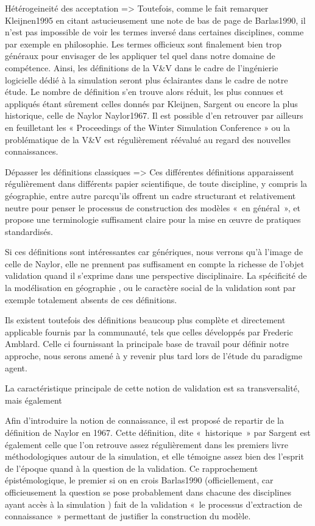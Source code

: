 Hétérogeineité des acceptation => Toutefois, comme le fait remarquer {Kleijnen1995} en citant astucieusement une note de bas de page de {Barlas1990}, il n'est pas impossible de voir les termes inversé dans certaines disciplines, comme par exemple en philosophie. Les termes officieux sont finalement bien trop généraux pour envisager de les appliquer tel quel dans notre domaine de compétence. Ainsi, les définitions de la V\&V dans le cadre de l'ingénierie logicielle dédié à la simulation seront plus éclairantes dans le cadre de notre étude. Le nombre de définition s'en trouve alors réduit, les plus connues et appliqués étant sûrement celles donnés par Kleijnen, Sargent ou encore la plus historique, celle de Naylor {Naylor1967}. Il est possible d'en retrouver par ailleurs en feuilletant les « Proceedings of the Winter Simulation Conference » ou la problématique de la V&V est régulièrement réévalué au regard des nouvelles connaissances. 



Dépasser les définitions classiques => Ces différentes définitions apparaissent régulièrement dans différents papier scientifique, de toute discipline, y compris la géographie, entre autre parcqu'ils offrent un cadre structurant et relativement neutre pour penser le processus de construction des modèles « en général », et propose une terminologie suffisament claire pour la mise en œuvre de pratiques standardisés. 

Si ces définitions sont intéressantes car génériques, nous verrons qu'à l'image de celle de Naylor, elle ne prennent pas suffisament en compte la richesse de l'objet validation quand il s'exprime dans une perspective disciplinaire. La spécificité de la modélisation en géographie , ou le caractère social de la validation sont par exemple totalement absents de ces définitions. 

Ils existent toutefois des définitions beaucoup plus complète et directement applicable fournis par la communauté, tels que celles développés par Frederic Amblard. Celle ci fournissant la principale base de travail pour définir notre approche, nous serons amené à y revenir plus tard lors de l'étude du paradigme agent.

La caractéristique principale de cette notion de validation est sa transversalité, mais également  

Afin d'introduire la notion de connaissance, il est proposé de repartir de la définition de Naylor en 1967. Cette définition, dite  « historique » par Sargent est également celle que l'on retrouve assez régulièrement dans les premiers livre méthodologiques autour de la simulation, et elle témoigne assez bien des l'esprit de l'époque quand à la question de la validation. 
Ce rapprochement épistémologique, le premier si on en crois {Barlas1990} (officiellement, car officieusement la question se pose probablement dans chacune des disciplines ayant accès à la simulation ) fait de la validation « le processus d'extraction de connaissance » permettant de justifier la construction du modèle. 

